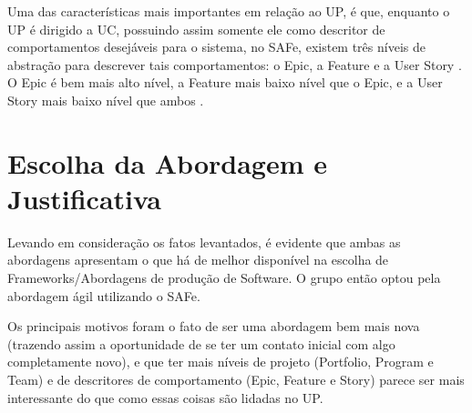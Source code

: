 Uma das características mais importantes em relação ao UP, é que, enquanto o UP é dirigido a UC, possuindo assim somente ele como descritor de comportamentos desejáveis para o sistema, no SAFe, existem três níveis de abstração para descrever tais comportamentos: o Epic, a Feature e a User Story \cite{safe004}. O Epic é bem mais alto nível, a Feature mais baixo nível que o Epic, e a User Story mais baixo nível que ambos \cite{safe004}.

\section{Escolha da Abordagem e Justificativa}
Levando em consideração os fatos levantados, é evidente que ambas as abordagens apresentam o que há de melhor disponível na escolha de Frameworks/Abordagens de produção de Software. O grupo então optou pela abordagem ágil utilizando o SAFe.

Os principais motivos foram o fato de ser uma abordagem bem mais nova (trazendo assim a oportunidade de se ter um contato inicial com algo completamente novo), e que ter mais níveis de projeto (Portfolio, Program e Team) e de descritores de comportamento (Epic, Feature e Story) parece ser mais interessante do que como essas coisas são lidadas no UP.
